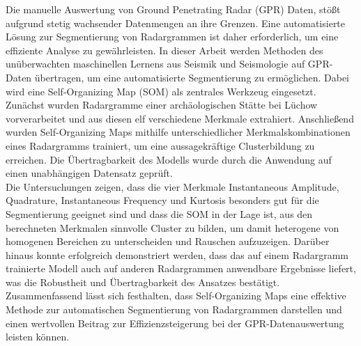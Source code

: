 Die manuelle Auswertung von Ground Penetrating Radar (GPR) Daten, stößt aufgrund stetig wachsender Datenmengen an ihre Grenzen. Eine automatisierte Lösung zur Segmentierung von Radargrammen ist daher erforderlich, um eine effiziente Analyse zu gewährleisten. In dieser Arbeit werden Methoden des unüberwachten maschinellen Lernens aus Seismik und Seismologie auf GPR-Daten übertragen, um eine automatisierte Segmentierung zu ermöglichen. Dabei wird eine Self-Organizing Map (SOM) als zentrales Werkzeug eingesetzt. Zunächst wurden Radargramme einer archäologischen Stätte bei Lüchow vorverarbeitet und aus diesen elf verschiedene Merkmale extrahiert. Anschließend wurden Self-Organizing Maps mithilfe unterschiedlicher Merkmalskombinationen eines Radargramms trainiert, um eine aussagekräftige Clusterbildung zu erreichen. Die Übertragbarkeit des Modells wurde durch die Anwendung auf einen unabhängigen Datensatz geprüft. \\
Die Untersuchungen zeigen, dass die vier Merkmale Instantaneous Amplitude, Quadrature, Instantaneous Frequency und Kurtosis besonders gut für die Segmentierung geeignet sind und dass die SOM in der Lage ist, aus den berechneten Merkmalen sinnvolle Cluster zu bilden, um damit heterogene von homogenen Bereichen zu unterscheiden und Rauschen aufzuzeigen. Darüber hinaus konnte erfolgreich demonstriert werden, dass das auf einem Radargramm trainierte Modell auch auf anderen Radargrammen anwendbare Ergebnisse liefert, was die Robustheit und Übertragbarkeit des Ansatzes bestätigt.\\
Zusammenfassend lässt sich festhalten, dass Self-Organizing Maps eine effektive Methode zur automatischen Segmentierung von Radargrammen darstellen und einen wertvollen Beitrag zur Effizienzsteigerung bei der GPR-Datenauswertung leisten können.